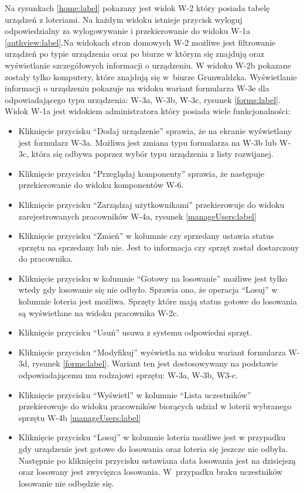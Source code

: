 Na rysunkach \ref{home:label} pokazany jest widok W-2 który posiada tabelę urządzeń z loteriami. Na każdym widoku istnieje przycisk wyloguj odpowiedzialny za wylogowywanie i przekierowanie do widoku W-1a \ref{authview:label}.Na widokach stron domowych W-2 możliwe jest filtrowanie urządzeń po typie urządzenia oraz po biurze w którym się znajdują oraz wyświetlanie szczegółowych informacji o urządzeniu. W widoku W-2b pokazane zostały tylko komputery, które znajdują się w~biurze Grunwaldzka. Wyświetlanie informacji o urządzeniu pokazuje na widoku wariant formularza W-3e dla odpowiadającego typu urządzenia: W-3a, W-3b, W-3c, rysunek \ref{forms:label}. Widok W-1a jest widokiem administratora który posiada wiele funkcjonalności:
\begin{itemize}
	\item Kliknięcie przycisku "`Dodaj urządzenie"' sprawia, że na ekranie wyświetlany jest formularz W-3a. Możliwa jest zmiana typu formularza na W-3b lub W-3c, która się odbywa poprzez wybór typu urządzenia z listy rozwijanej.
	\item Kliknięcie przycisku "`Przeglądaj komponenty"' sprawia, że następuje przekierowanie do widoku komponentów W-6.
	\item Kliknięcie przycisku "`Zarządzaj użytkownikami"' przekierowuje do widoku zarejestrowanych pracowników W-4a, rysunek \ref{manageUsers:label}
	\item Kliknięcie przycisku "`Zmień"' w kolumnie czy sprzedany ustawia status sprzętu na sprzedany lub nie. Jest to informacja czy sprzęt został dostarczony do pracownika.
	\item Kliknięcie przycisku w kolumnie "`Gotowy na losowanie"' możliwe jest tylko wtedy gdy losowanie się nie odbyło. Sprawia ono, że operacja "`Losuj"' w kolumnie loteria jest możliwa. Sprzęty które mają status gotowe do losowania są wyświetlane na widoku pracownika W-2c.
	\item Kliknięcie przycisku "`Usuń"' usuwa z systemu odpowiedni sprzęt.
	\item Kliknięcie przycisku "`Modyfikuj"' wyświetla na widoku wariant formularza W-3d, rysunek \ref{forms:label}. Wariant ten jest dostosowywany na podstawie odpowiadającemu mu rodzajowi sprzętu: W-3a, W-3b, W3-c.
	\item Kliknięcie przycisku "`Wyświetl"' w kolumnie "`Lista uczestników"' przekierowuje do widoku pracowników biorących udział w loterii wybranego sprzętu W-4b \ref{manageUsers:label}
	\item Kliknięcie przycisku "`Losuj"' w kolumnie loteria możliwe jest w przypadku gdy urządzenie jest gotowe do losowania oraz loteria się jeszcze nie odbyła. Następnie po kliknięciu przycisku ustawiana data losowania jest na dzisiejszą oraz losowany jest zwycięzca losowania. W~przypadku braku uczestników losowanie nie odbędzie się.
\end{itemize}
